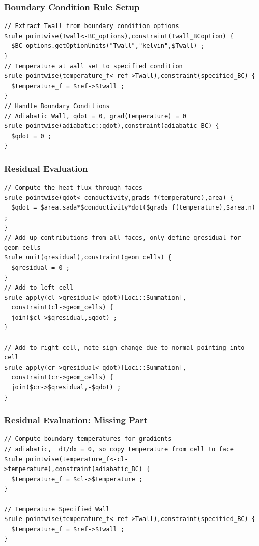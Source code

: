 \documentclass{beamer}
\begin{document}
\begin{frame}[fragile=singleslide]\frametitle{Boundary Condition Rule Setup}
\scriptsize
\begin{verbatim}
// Extract Twall from boundary condition options
$rule pointwise(Twall<-BC_options),constraint(Twall_BCoption) {
  $BC_options.getOptionUnits("Twall","kelvin",$Twall) ;
}
// Temperature at wall set to specified condition
$rule pointwise(temperature_f<-ref->Twall),constraint(specified_BC) {
  $temperature_f = $ref->$Twall ;
}
// Handle Boundary Conditions
// Adiabatic Wall, qdot = 0, grad(temperature) = 0
$rule pointwise(adiabatic::qdot),constraint(adiabatic_BC) {
  $qdot = 0 ;
}
\end{verbatim}
\end{frame}

\begin{frame}[fragile=singleslide]\frametitle{Residual Evaluation}
\scriptsize
\begin{verbatim}
// Compute the heat flux through faces
$rule pointwise(qdot<-conductivity,grads_f(temperature),area) {
  $qdot = $area.sada*$conductivity*dot($grads_f(temperature),$area.n) ;
}
// Add up contributions from all faces, only define qresidual for geom_cells
$rule unit(qresidual),constraint(geom_cells) {
  $qresidual = 0 ;
}
// Add to left cell
$rule apply(cl->qresidual<-qdot)[Loci::Summation],
  constraint(cl->geom_cells) {
  join($cl->$qresidual,$qdot) ;
}

// Add to right cell, note sign change due to normal pointing into cell
$rule apply(cr->qresidual<-qdot)[Loci::Summation],
  constraint(cr->geom_cells) {
  join($cr->$qresidual,-$qdot) ;
}
\end{verbatim}
\end{frame}
\begin{frame}[fragile=singleslide]\frametitle{Residual Evaluation: Missing Part}
\scriptsize
\begin{verbatim}
// Compute boundary temperatures for gradients
// adiabatic,  dT/dx = 0, so copy temperature from cell to face
$rule pointwise(temperature_f<-cl->temperature),constraint(adiabatic_BC) {
  $temperature_f = $cl->$temperature ;
}

// Temperature Specified Wall
$rule pointwise(temperature_f<-ref->Twall),constraint(specified_BC) {
  $temperature_f = $ref->$Twall ;
}
\end{verbatim}
\end{frame}
\end{document}

